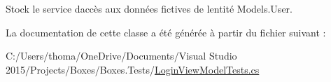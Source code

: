 Stock le service d\textquotesingle{}accès aux données fictives de l\textquotesingle{}entité Models.\+User. 



La documentation de cette classe a été générée à partir du fichier suivant \+:\begin{DoxyCompactItemize}
\item 
C\+:/\+Users/thoma/\+One\+Drive/\+Documents/\+Visual Studio 2015/\+Projects/\+Boxes/\+Boxes.\+Tests/\hyperlink{_login_view_model_tests_8cs}{Login\+View\+Model\+Tests.\+cs}\end{DoxyCompactItemize}
